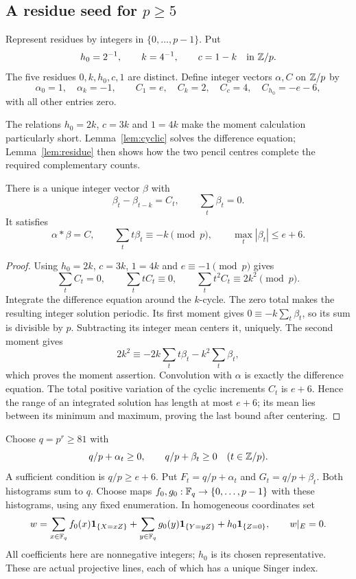 \subsection{A residue seed for \texorpdfstring{$p\ge5$}{p at least 5}}
Represent residues by integers in $\{0,\ldots,p-1\}$. Put
\[
 h_0=2^{-1},\qquad k=4^{-1},\qquad c=1-k \quad\text{in }\mathbb Z/p.
\]
The five residues $0,k,h_0,c,1$ are distinct. Define integer vectors $\alpha,C$ on $\mathbb Z/p$ by
\begin{equation}\label{eq:histogram-target}
 \alpha_0=1,\quad\alpha_k=-1,\qquad
 C_1=e,\quad C_k=2,\quad C_c=4,\quad C_{h_0}=-e-6,
\end{equation}
with all other entries zero.

The relations $h_0=2k$, $c=3k$ and $1=4k$ make the moment calculation particularly short. Lemma~\ref{lem:cyclic} solves the difference equation; Lemma~\ref{lem:residue} then shows how the two pencil centres complete the required complementary counts.

\begin{lemma}\label{lem:cyclic}
There is a unique integer vector $\beta$ with
\begin{equation}\label{eq:beta}
 \beta_t-\beta_{t-k}=C_t,\qquad\sum_t\beta_t=0.
\end{equation}
It satisfies
\[
 \alpha*\beta=C,\qquad \sum_t t\beta_t\equiv-k\pmod p,
 \qquad \max_t|\beta_t|\le e+6.
\]
\end{lemma}
\begin{proof}
Using $h_0=2k$, $c=3k$, $1=4k$ and $e\equiv-1\pmod p$ gives
\[
 \sum_tC_t=0,\qquad \sum_t tC_t\equiv0,\qquad
 \sum_t t^2C_t\equiv2k^2\pmod p.
\]
Integrate the difference equation around the $k$-cycle. The zero total makes the resulting integer solution periodic. Its first moment gives
$0\equiv-k\sum_t\beta_t$, so its sum is divisible by $p$. Subtracting its integer mean centers it, uniquely. The second moment gives
\[
 2k^2\equiv-2k\sum_t t\beta_t-k^2\sum_t\beta_t,
\]
which proves the moment assertion. Convolution with $\alpha$ is exactly the difference equation. The total positive variation of the cyclic increments $C_t$ is $e+6$. Hence the range of an integrated solution has length at most $e+6$; its mean lies between its minimum and maximum, proving the last bound after centering.
\end{proof}

Choose $q=p^r\ge81$ with
\begin{equation}\label{eq:histogram-feasible}
 q/p+\alpha_t\ge0,\qquad q/p+\beta_t\ge0\quad(t\in\mathbb Z/p).
\end{equation}
A sufficient condition is $q/p\ge e+6$. Put $F_t=q/p+\alpha_t$ and $G_t=q/p+\beta_t$. Both histograms sum to $q$. Choose maps $f_0,g_0:\mathbb F_q\to\{0,\ldots,p-1\}$ with these histograms, using any fixed enumeration. In homogeneous coordinates set
\begin{equation}\label{eq:seed}
 w=\sum_{x\in\mathbb F_q}f_0(x)\mathbf1_{\{X=xZ\}}
   +\sum_{y\in\mathbb F_q}g_0(y)\mathbf1_{\{Y=yZ\}}
   +h_0\mathbf1_{\{Z=0\}},\qquad w|_E=0.
\end{equation}
All coefficients here are nonnegative integers; $h_0$ is its chosen representative. These are actual projective lines, each of which has a unique Singer index.

